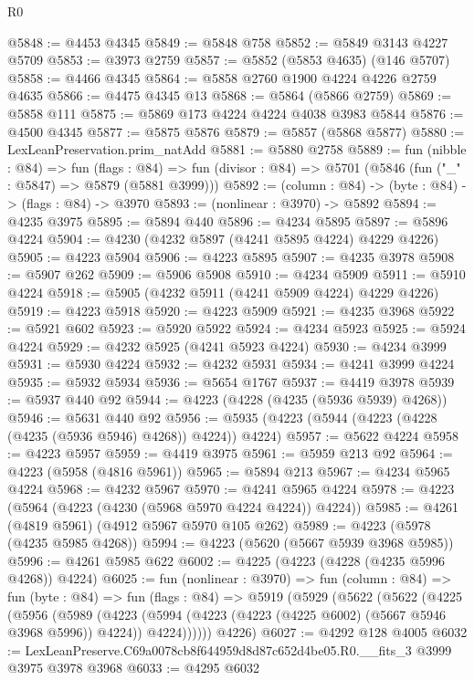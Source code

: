 \begin{lexlean}{R0}
\begin{coremodule}
@5848 := @4453 @4345
@5849 := @5848 @758
@5852 := @5849 @3143 @4227 @5709
@5853 := @3973 @2759
@5857 := @5852 (@5853 @4635) (@146 @5707)
@5858 := @4466 @4345
@5864 := @5858 @2760 @1900 @4224 @4226 @2759 @4635
@5866 := @4475 @4345 @13
@5868 := @5864 (@5866 @2759)
@5869 := @5858 @111
@5875 := @5869 @173 @4224 @4224 @4038 @3983 @5844
@5876 := @4500 @4345
@5877 := @5875 @5876
@5879 := @5857 (@5868 @5877)
@5880 := LexLeanPreservation.prim_natAdd
@5881 := @5880 @2758
@5889 := fun (nibble : @84) =>
  fun (flags : @84) =>
  fun (divisor : @84) => @5701 (@5846 (fun ("_" : @5847) => @5879 (@5881 @3999)))
@5892 := (column : @84) -> (byte : @84) -> (flags : @84) -> @3970
@5893 := (nonlinear : @3970) -> @5892
@5894 := @4235 @3975
@5895 := @5894 @440
@5896 := @4234 @5895
@5897 := @5896 @4224
@5904 := @4230 (@4232 @5897 (@4241 @5895 @4224) @4229 @4226)
@5905 := @4223 @5904
@5906 := @4223 @5895
@5907 := @4235 @3978
@5908 := @5907 @262
@5909 := @5906 @5908
@5910 := @4234 @5909
@5911 := @5910 @4224
@5918 := @5905 (@4232 @5911 (@4241 @5909 @4224) @4229 @4226)
@5919 := @4223 @5918
@5920 := @4223 @5909
@5921 := @4235 @3968
@5922 := @5921 @602
@5923 := @5920 @5922
@5924 := @4234 @5923
@5925 := @5924 @4224
@5929 := @4232 @5925 (@4241 @5923 @4224)
@5930 := @4234 @3999
@5931 := @5930 @4224
@5932 := @4232 @5931
@5934 := @4241 @3999 @4224
@5935 := @5932 @5934
@5936 := @5654 @1767
@5937 := @4419 @3978
@5939 := @5937 @440 @92
@5944 := @4223 (@4228 (@4235 (@5936 @5939) @4268))
@5946 := @5631 @440 @92
@5956 := @5935 (@4223 (@5944 (@4223 (@4228 (@4235 (@5936 @5946) @4268)) @4224)) @4224)
@5957 := @5622 @4224
@5958 := @4223 @5957
@5959 := @4419 @3975
@5961 := @5959 @213 @92
@5964 := @4223 (@5958 (@4816 @5961))
@5965 := @5894 @213
@5967 := @4234 @5965 @4224
@5968 := @4232 @5967
@5970 := @4241 @5965 @4224
@5978 := @4223 (@5964 (@4223 (@4230 (@5968 @5970 @4224 @4224)) @4224))
@5985 := @4261 (@4819 @5961) (@4912 @5967 @5970 @105 @262)
@5989 := @4223 (@5978 (@4235 @5985 @4268))
@5994 := @4223 (@5620 (@5667 @5939 @3968 @5985))
@5996 := @4261 @5985 @622
@6002 := @4225 (@4223 (@4228 (@4235 @5996 @4268)) @4224)
@6025 := fun (nonlinear : @3970) =>
  fun (column : @84) =>
  fun (byte : @84) =>
  fun (flags : @84) =>
  @5919
    (@5929
      (@5622
        (@5622
          (@4225
            (@5956
              (@5989
                (@4223
                  (@5994 (@4223 (@4223 (@4225 @6002) (@5667 @5946 @3968 @5996)) @4224))
                  @4224))))))
      @4226)
@6027 := @4292 @128 @4005
@6032 := LexLeanPreserve.C69a0078cb8f644959d8d87c652d4be05.R0.__fits_3 @3999 @3975 @3978 @3968
@6033 := @4295 @6032

\end{coremodule}
\end{lexlean}
